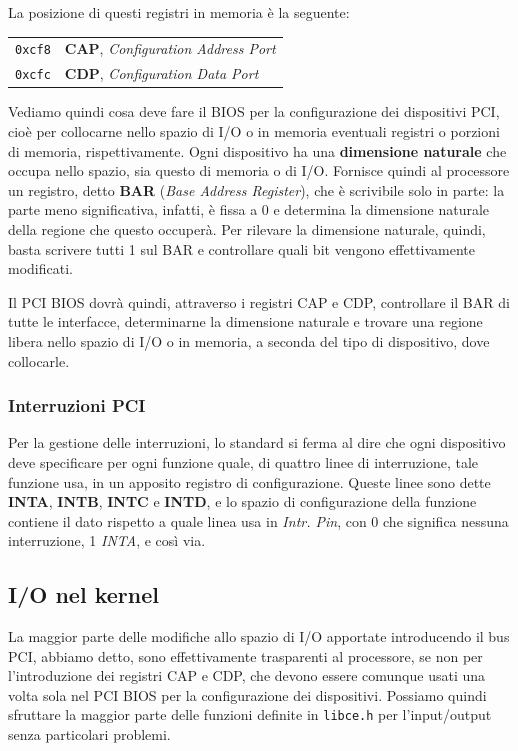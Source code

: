 \documentclass[a4paper,11pt]{article}
\begin{document}
La posizione di questi registri in memoria è la seguente:
\begin{table}[h!]
	\center
	\begin{tabular} { c | p{7cm} }
		\lstinline|0xcf8| & \textbf{CAP}, \textit{Configuration Address Port} \\
		\lstinline|0xcfc| & \textbf{CDP}, \textit{Configuration Data Port}	
	\end{tabular}
\end{table}

Vediamo quindi cosa deve fare il BIOS per la configurazione dei dispositivi PCI, cioè per collocarne nello spazio di I/O o in memoria eventuali registri o porzioni di memoria, rispettivamente.
Ogni dispositivo ha una \textbf{dimensione naturale} che occupa nello spazio, sia questo di memoria o di I/O.
Fornisce quindi al processore un registro, detto \textbf{BAR} (\textit{Base Address Register}), che è scrivibile solo in parte: la parte meno significativa, infatti, è fissa a 0 e determina la dimensione naturale della regione che questo occuperà.
Per rilevare la dimensione naturale, quindi, basta scrivere tutti 1 sul BAR e controllare quali bit vengono effettivamente modificati.

Il PCI BIOS dovrà quindi, attraverso i registri CAP e CDP, controllare il BAR di tutte le interfacce, determinarne la dimensione naturale e trovare una regione libera nello spazio di I/O o in memoria, a seconda del tipo di dispositivo, dove collocarle.

\subsubsection{Interruzioni PCI}
Per la gestione delle interruzioni, lo standard si ferma al dire che ogni dispositivo deve specificare per ogni funzione quale, di quattro linee di interruzione, tale funzione usa, in un apposito registro di configurazione.
Queste linee sono dette \textbf{INTA}, \textbf{INTB}, \textbf{INTC} e \textbf{INTD}, e lo spazio di configurazione della funzione contiene il dato rispetto a quale linea usa in \textit{Intr. Pin}, con 0 che significa nessuna interruzione, 1 \textit{INTA}, e così via.

\subsection{I/O nel kernel}
La maggior parte delle modifiche allo spazio di I/O apportate introducendo il bus PCI, abbiamo detto, sono effettivamente trasparenti al processore, se non per l'introduzione dei registri CAP e CDP, che devono essere comunque usati una volta sola nel PCI BIOS per la configurazione dei dispositivi.
Possiamo quindi sfruttare la maggior parte delle funzioni definite in \lstinline|libce.h| per l'input/output senza particolari problemi.
\end{document}
